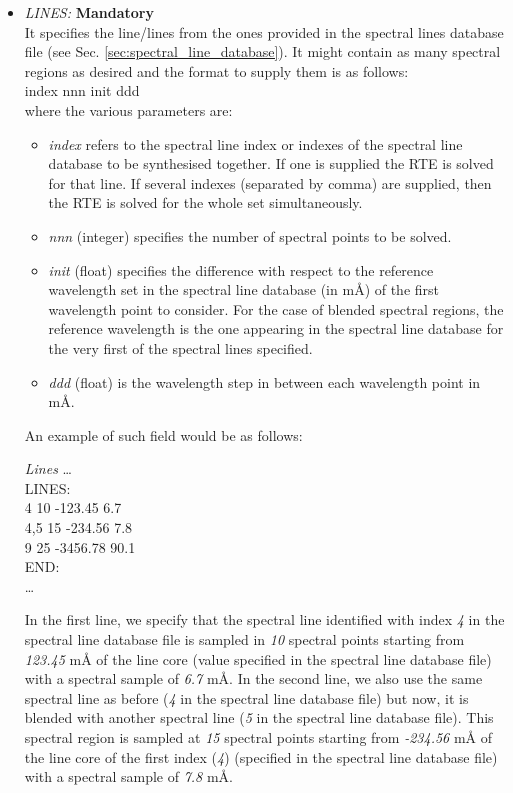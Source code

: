 \begin{itemize}
  \item {\it LINES:} {\bf Mandatory}\\
  It specifies the line/lines from the ones provided in the spectral lines database file (see Sec. \ref{sec:spectral_line_database}). It might contain as many spectral regions as desired and the format to supply them is as follows:\\
  index  nnn   init    ddd\\
  where the various parameters are:
  \begin{itemize}
    \item {\it index} refers to the spectral line index or indexes of the spectral line database to be synthesised together. If one is supplied the RTE is solved for that line. If several indexes (separated by comma) are supplied, then the RTE is solved for the whole set simultaneously.
    \item {\it nnn} (integer) specifies the number of spectral points to be solved.
    \item {\it init} (float) specifies the difference with respect to the reference wavelength set in the spectral line database (in m{\AA}) of the first wavelength point to consider. For the case of blended spectral regions, the reference wavelength is the one appearing in the spectral line database for the very first of the spectral lines specified.
    \item {\it ddd} (float) is the wavelength step in between each wavelength point in m{\AA}.
  \end{itemize}
  An example of such field would be as follows:\\
\begin{ifbox}[label={tb:lines}]{{\it Lines}}
  \scriptsize
  \ldots\\
  LINES:\\
  4 10 -123.45 6.7\\
  4,5 15 -234.56 7.8\\
  9 25 -3456.78 90.1\\
  END:\\
  \ldots
  \normalsize
\end{ifbox}
  In the first line, we specify that the spectral line identified with index {\it 4} in the spectral line database file is sampled in {\it 10} spectral points starting from {\it 123.45} m{\AA} of the line core (value specified in the spectral line database file) with a spectral sample of {\it 6.7} m{\AA}.
  In the second line, we also use the same spectral line as before ({\it 4} in the spectral line database file) but now, it is blended with another spectral line ({\it 5} in the spectral line database file). This spectral region is sampled at {\it 15} spectral points starting from {\it -234.56} m{\AA} of the line core of the first index ({\it 4}) (specified in the spectral line database file) with a spectral sample of {\it 7.8} m{\AA}.

\end{itemize}
